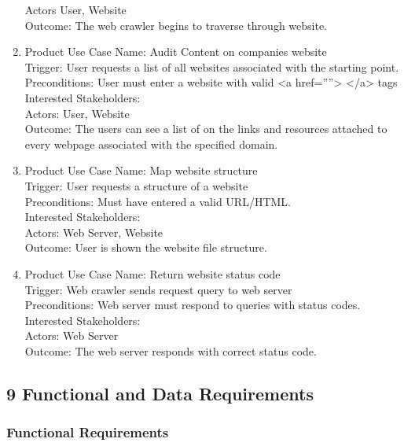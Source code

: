\documentclass[titlepage]{article}
\begin{document}
\begin{enumerate}
Actors User, Website\\
Outcome: The web crawler begins to traverse through website.\\
  \item Product Use Case Name: Audit Content on companies website \\
Trigger: User requests a list of all websites associated with the starting point.\\
Preconditions: User must enter a website with valid <a href=””> </a> tags\\
Interested Stakeholders: \\
Actors: User, Website\\
Outcome: The users can see a list of on the links and resources attached to every webpage associated with the specified domain.\\
  \item Product Use Case Name: Map website structure\\
Trigger: User requests a structure of a website\\
Preconditions: Must have entered a valid URL/HTML.\\
Interested Stakeholders: \\
Actors: Web Server, Website\\
Outcome: User is shown the website file structure.\\
  \item Product Use Case Name: Return website status code\\
Trigger: Web crawler sends request query to web server\\
Preconditions: Web server must respond to queries with status codes. \\
Interested Stakeholders: \\
Actors: Web Server\\
Outcome: The web server responds with correct status code.\\
\end{enumerate}

\subsection{9 Functional and Data Requirements}

\subsubsection*{Functional Requirements}
\end{document}

